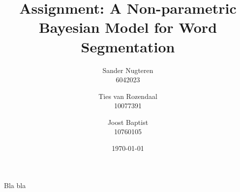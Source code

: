 \documentclass{article}
\title{Assignment: A Non-parametric Bayesian Model for Word Segmentation}
\author{Sander Nugteren\\ 6042023 \and Ties van Rozendaal\\ 10077391 \and Joost Baptist\\ 10760105}
\date{\today}
\begin{document}
\maketitle








Bla bla \cite{Goldwater200921} %


\end{document}
